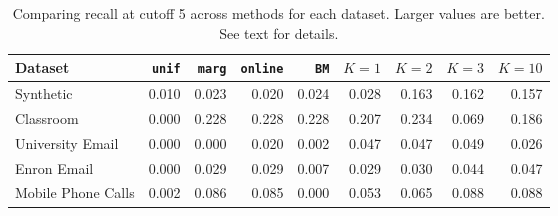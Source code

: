 \begin{table}[t]
\begin{center}
{\footnotesize
\begin{tabular}{lrrrrrrrr}
  \hline
Dataset & \texttt{unif} & \texttt{marg} & \texttt{online} & \texttt{BM} & $K=1$ & $K=2$ & $K=3$ & $K=10$ \\ 
  \hline
Synthetic & 0.010 & 0.023 & 0.020 & 0.024 & 0.028 & 0.163 & 0.162 & 0.157 \\ 
  Classroom & 0.000 & 0.228 & 0.228 & 0.228 & 0.207 & 0.234 & 0.069 & 0.186 \\ 
  University Email & 0.000 & 0.000 & 0.020 & 0.002 & 0.047 & 0.047 & 0.049 & 0.026 \\ 
  Enron Email & 0.000 & 0.029 & 0.029 & 0.007 & 0.029 & 0.030 & 0.044 & 0.047 \\ 
  Mobile Phone Calls & 0.002 & 0.086 & 0.085 & 0.000 & 0.053 & 0.065 & 0.088 & 0.088 \\ 
   \hline
\end{tabular}
}
\caption{Comparing recall at cutoff 5 across methods for each dataset.  Larger values are better.  See text for details.}
\label{tab:recall5}
\end{center}
\end{table}
